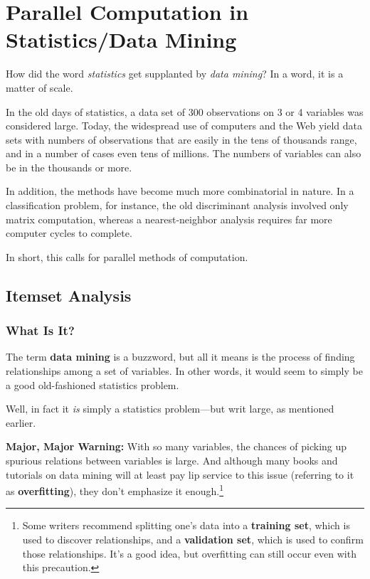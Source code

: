 \chapter{Parallel Computation in Statistics/Data Mining}
\label{chap:stat}

How did the word {\it statistics} get supplanted by {\it data mining}?
In a word, it is a matter of scale.

In the old days of statistics, a data set of 300 observations on 3 or 4
variables was considered large.  Today, the widespread use of computers
and the Web yield data sets with numbers of observations that are easily
in the tens of thousands range, and in a number of cases even tens of
millions.  The numbers of variables can also be in the thousands or
more.

In addition, the methods have become much more combinatorial in nature.
In a classification problem, for instance, the old discriminant analysis
involved only matrix computation, whereas a nearest-neighbor analysis
requires far more computer cycles to complete.

In short, this calls for parallel methods of computation.

\section{Itemset Analysis}

\subsection{What Is It?}

The term {\bf data mining} is a buzzword, but all it means is the
process of finding relationships among a set of variables.  In other
words, it would seem to simply be a good old-fashioned statistics
problem.

Well, in fact it {\it is} simply a statistics problem---but writ large,
as mentioned earlier.

{\bf Major, Major Warning:}  With so many variables, the chances of
picking up spurious relations between variables is large.  And although
many books and tutorials on data mining will at least pay lip service to
this issue (referring to it as {\bf overfitting}), they don't emphasize
it enough.\footnote{Some writers recommend splitting one's data into a
{\bf training set}, which is used to discover relationships, and a {\bf
validation set}, which is used to confirm those relationships.  It's a
good idea, but overfitting can still occur even with this precaution.}

